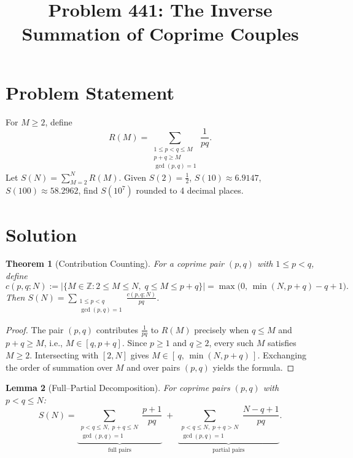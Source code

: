 \documentclass[12pt]{article}
\title{Problem 441: The Inverse Summation of Coprime Couples}
\author{}
\date{}
\newtheorem{theorem}{Theorem}
\newtheorem{lemma}[theorem]{Lemma}
\begin{document}
\maketitle

\section{Problem Statement}
For $M \geq 2$, define
\[
R(M) = \sum_{\substack{1 \leq p < q \leq M \\ p + q \geq M \\ \gcd(p,q) = 1}} \frac{1}{pq}.
\]
Let $S(N) = \sum_{M=2}^{N} R(M)$. Given $S(2) = \tfrac{1}{2}$, $S(10) \approx 6.9147$, $S(100) \approx 58.2962$, find $S(10^7)$ rounded to 4 decimal places.

\section{Solution}

\begin{theorem}[Contribution Counting]
\label{thm:contrib}
For a coprime pair $(p,q)$ with $1 \leq p < q$, define
\[
c(p,q;N) := \bigl|\{M \in \mathbb{Z} : 2 \leq M \leq N,\; q \leq M \leq p + q\}\bigr| = \max\!\bigl(0,\, \min(N, p+q) - q + 1\bigr).
\]
Then $S(N) = \displaystyle\sum_{\substack{1 \leq p < q \\ \gcd(p,q) = 1}} \frac{c(p,q;N)}{pq}$.
\end{theorem}

\begin{proof}
The pair $(p,q)$ contributes $\frac{1}{pq}$ to $R(M)$ precisely when $q \leq M$ and $p + q \geq M$, i.e., $M \in [q, p+q]$. Since $p \geq 1$ and $q \geq 2$, every such $M$ satisfies $M \geq 2$. Intersecting with $[2, N]$ gives $M \in [\,q,\, \min(N,p+q)\,]$. Exchanging the order of summation over $M$ and over pairs $(p,q)$ yields the formula.
\end{proof}

\begin{lemma}[Full--Partial Decomposition]
\label{lem:split}
For coprime pairs $(p,q)$ with $p < q \leq N$:
\[
S(N) = \underbrace{\sum_{\substack{p < q \leq N,\; p+q \leq N \\ \gcd(p,q) = 1}} \frac{p+1}{pq}}_{\text{full pairs}} \;+\; \underbrace{\sum_{\substack{p < q \leq N,\; p+q > N \\ \gcd(p,q) = 1}} \frac{N - q + 1}{pq}}_{\text{partial pairs}}.
\]
\end{lemma}
\end{document}
